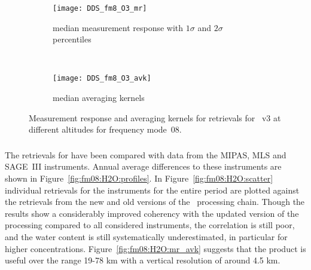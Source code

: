 \begin{figure}[htpb]
    \centering
    \begin{subfigure}[b]{0.49\textwidth}
        \texttt{[image: DDS\_fm8\_O3\_mr]}
        \caption{median measurement response with $1\sigma$ and $2\sigma$
        percentiles}
        \label{fig:fm08:O3:mr}
    \end{subfigure}
    \,
    \begin{subfigure}[b]{0.49\textwidth}
        \texttt{[image: DDS\_fm8\_O3\_avk]}
        \caption{median averaging kernels\newline~}
        \label{fig:fm08:O3:avk}
    \end{subfigure}
    \caption{Measurement response and averaging kernels for 
    retrievals for \smr~v3 at different altitudes for frequency mode~08.}
    \label{fig:fm08:O3:mr_avk}
\end{figure}



\subsubsection{}
\label{sec:fm08:comparison:H2O}
The retrievals for  have been compared with data from the MIPAS,
MLS and SAGE~III instruments. Annual average differences to these instruments
are shown in Figure~\ref{fig:fm08:H2O:profiles}. In
Figure~\ref{fig:fm08:H2O:scatter} individual retrievals for the instruments for
the entire period are plotted against the retrievals from the new and old
versions of the \smr\ processing chain. Though the results show a considerably
improved coherency with the updated version of the processing compared to all
considered instruments, the correlation is still poor, and the water content is
still systematically underestimated, in particular for higher concentrations.
Figure~\ref{fig:fm08:H2O:mr_avk} suggests that the product is useful over the range 19-78 km with a vertical resolution of around 4.5 km. 




